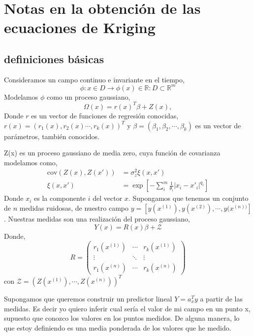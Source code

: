 \documentclass[10pt,a4paper]{report}
\begin{document}
\section{Notas en la obtención de las ecuaciones de Kriging}
\subsection{definiciones básicas}
Consideramos un campo continuo e invariante en el tiempo,
\begin{equation*}
\phi:x\in D \rightarrow \phi(x) \in \mathbb{R}: D \subset \mathbb{R}^m
\end{equation*}
Modelamos $\phi$ como un proceso gaussiano,
\begin{equation}
\Omega(x) = r(x)^T\beta+ Z(x),
\end{equation}
Donde $r$ es un vector de funciones de regresión conocidas,\\
$r(x) = (r_1(x),r_2(x)\cdots, r_k(x))^T$ y $\beta =(\beta_1,\beta_2,\cdots, \beta_k)$ es un vector de parámetros, también conocidos.
 
Z(x) es un proceso gaussiano de media zero, cuya función de covarianza modelamos como,
\begin{equation}\label{eq:cov}
\begin{split}
\text{cov}(Z(x),Z(x')) &= \sigma_z^2\xi(x,x')\\
\xi(x,x') &= \exp\left[-\sum_i^m\frac{1}{\theta_i}\vert x_i-x'_i\vert ^{q_i}\right]
\end{split}
\end{equation}
Donde $x_i$ es la componente $i$ del vector $x$.
Supongamos que tenemos un conjunto de $n$ medidas ruidosas, de nuestro campo $y = [y(x^{(1)}),y(x^{(2)}),\cdots, y(x^{(n))}]$. Nuestras medidas son una realización del proceso gaussiano,
\begin{equation}
Y(x) = R(x)\beta + \mathcal{Z}
\end{equation}
Donde,
\begin{equation}
R = \begin{pmatrix}
r_1(x^{(1)})&\cdots&r_k(x^{(1)})\\
\vdots &\ddots&\vdots\\
r_1(x^{(n)})&\cdots&r_k(x^{(n)})
\end{pmatrix}
\end{equation}
con $\mathcal{Z} = (Z(x^{(1)}),\cdots,Z(x^{(n)}))^T$

Supongamos que queremos construir un predictor lineal $Y = a_x^Ty$ a partir de las medidas. Es decir yo quiero inferir cual sería el valor de mi campo en un punto x, supuesto que conozco los valores en los puntos medidos. De alguna manera, lo que estoy definiendo es una media ponderada de los valores que he medido. 
\end{document}
